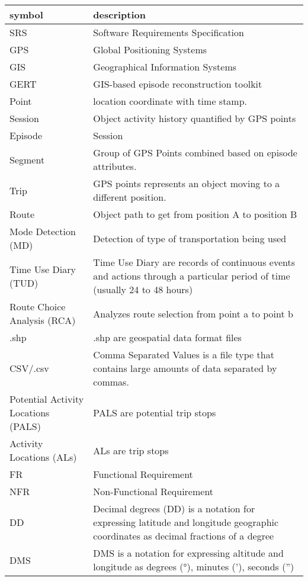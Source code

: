 \documentclass[12pt, titlepage]{article}
\begin{document}
\renewcommand{\arraystretch}{1.2}
\begin{tabular}{l p{10cm}} 
  \toprule		
  \textbf{symbol} & \textbf{description}\\
  \midrule 
  SRS & Software Requirements Specification \\
  GPS & Global Positioning Systems\\
  GIS & Geographical Information Systems\\
  GERT & GIS-based episode reconstruction toolkit \\
  Point & location coordinate with time stamp.\\
  Session & Object activity history quantified by GPS points \\
  Episode & Session\\
  Segment & Group of GPS Points combined based on episode attributes.\\
  Trip & GPS points represents an object moving to a different position.\\
  Route & Object path to get from position A to position B\\
  Mode Detection (MD) & Detection of type of transportation being used \\
  Time Use Diary (TUD) & Time Use Diary are records of continuous events and actions through a particular period of time (usually 24 to 48 hours) \\
  Route Choice Analysis (RCA) &  Analyzes route selection from point a to point b\\
  .shp & .shp are geospatial data format files\\
  CSV/.csv & Comma Separated Values is a file type that contains large amounts of data separated by commas. \\
  Potential Activity Locations (PALS) & PALS are potential trip stops \\
  Activity Locations (ALs) & ALs are trip stops \\
  FR & Functional Requirement \\
  NFR & Non-Functional Requirement \\
  DD & Decimal degrees (DD) is a notation for expressing latitude and longitude geographic coordinates as decimal fractions of a degree \\
  DMS & DMS is a notation for expressing altitude and longitude as degrees (°), minutes ('), seconds ('')\\


  \bottomrule
\end{tabular}\\
\end{document}
